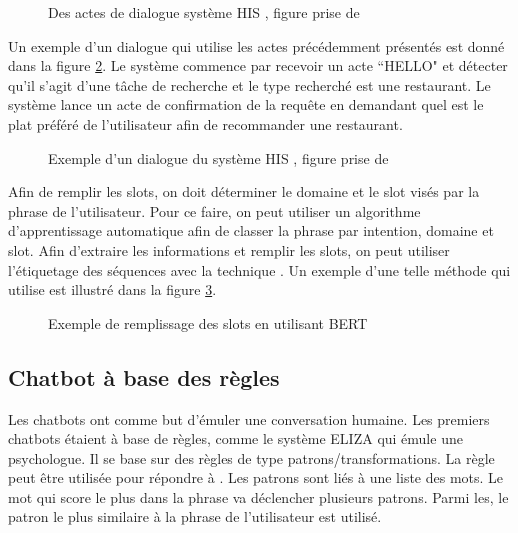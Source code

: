 \documentclass{KodeBook}
\begin{document}
\begin{figure}[!ht]
	\centering
	\caption{Des actes de dialogue système HIS \cite{2010-young-al}, figure prise de \cite{2020-jurafsky-martin}}
	\label{fig:sd-tache-his-acts}
\end{figure}

Un exemple d'un dialogue qui utilise les actes précédemment présentés est donné dans la figure \ref{fig:sd-tache-his-exp}.
Le système commence par recevoir un acte ``HELLO" et détecter qu'il s'agit d'une tâche de recherche et le type recherché est une restaurant. 
Le système lance un acte de confirmation de la requête en demandant quel est le plat préféré de l'utilisateur afin de recommander une restaurant. 

\begin{figure}[!ht]
	\centering
	\vspace{-6pt}
	\caption{Exemple d'un dialogue du système HIS \cite{2010-young-al}, figure prise de \cite{2020-jurafsky-martin}}
	\label{fig:sd-tache-his-exp}
\end{figure}

Afin de remplir les slots, on doit déterminer le domaine et le slot visés par la phrase de l'utilisateur. 
Pour ce faire, on peut utiliser un algorithme d'apprentissage automatique afin de classer la phrase par intention, domaine et slot. 
Afin d'extraire les informations et remplir les slots, on peut utiliser l'étiquetage des séquences avec la technique . 
Un exemple d'une telle méthode qui utilise  est illustré dans la figure \ref{fig:sd-tache-remp-bert}. 

\begin{figure}[!ht]
	\centering
	\caption{Exemple de remplissage des slots en utilisant BERT \cite{2020-jurafsky-martin}}
	\label{fig:sd-tache-remp-bert}
\end{figure}

\subsection{Chatbot à base des règles }

Les chatbots ont comme but d'émuler une conversation humaine. 
Les premiers chatbots étaient à base de règles, comme le système ELIZA \cite{1966-Weizenbaum} qui émule une psychologue. 
Il se base sur des règles de type patrons/transformations. 
La règle  peut être utilisée pour répondre à . 
Les patrons sont liés à une liste des mots. 
Le mot qui score le plus dans la phrase va déclencher plusieurs patrons. 
Parmi les, le patron le plus similaire à la phrase de l'utilisateur est utilisé.
\end{document}
